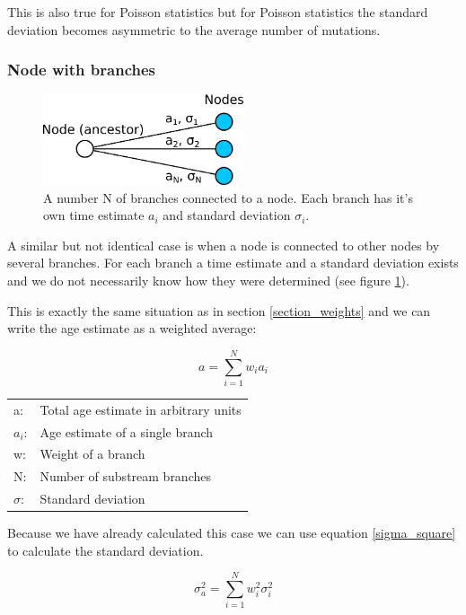 This is also true for Poisson statistics but for Poisson
statistics the standard deviation becomes asymmetric to
the average number of mutations.


\subsubsection*{Node with branches}

\begin{figure}[ht]
\centering
\includegraphics[width=5.9cm]{img/node_with_branches.png}
\caption{\label{node_with_branches} A number N of branches
connected to a node. Each branch has it's own time estimate
$a_i$ and standard deviation $\sigma_i$.}
\end{figure}

A similar but not identical case is when a node is connected
to other nodes by several branches. For each branch a time
estimate and a standard deviation exists and we do not necessarily
know how they were determined (see figure \ref{node_with_branches}).

This is exactly the same situation as in section \ref{section_weights}
and we can write the age estimate as a weighted average:

\begin{equation}
a = \sum_{i = 1}^{N} w_i a_i
\end{equation}

\begin{tabular}{ll}
a: &  Total age estimate in arbitrary units\\
$a_i$: &  Age estimate of a single branch\\
w: &  Weight of a branch\\
N: &  Number of substream branches\\
$\sigma$: & Standard deviation
\end{tabular}
\vspace{1em}

Because we have already calculated this case we can use
equation \ref{sigma_square} to calculate the standard
deviation.

\begin{equation}
\sigma_a^2 = \sum_{i = 1}^{N} w_i^2 \sigma_i^2 
\end{equation}


